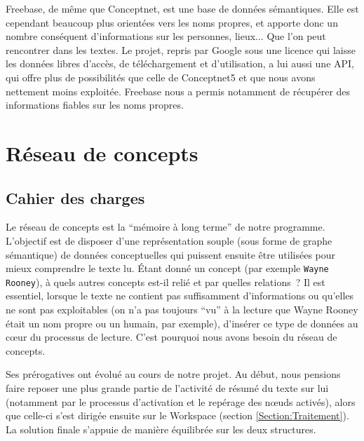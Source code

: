 \documentclass[a4paper, 12pt]{article}
\begin{document}
Freebase, de même que Conceptnet, est une base de données sémantiques. Elle est cependant beaucoup plus orientées vers les noms propres, et apporte donc un nombre conséquent d'informations sur les personnes, lieux... Que l'on peut rencontrer dans les textes. Le projet, repris par Google sous une licence qui laisse les données libres d'accès, de téléchargement et d'utilisation, a lui aussi une API, qui offre plus de possibilités que celle de Conceptnet5 et que nous avons nettement moins exploitée. Freebase nous a permis notamment de récupérer des informations fiables sur les noms propres.

\section{Réseau de concepts}\label{Section:RC}

\subsection{Cahier des charges}

Le réseau de concepts est la ``mémoire à long terme'' de notre programme. L'objectif est de disposer d'une représentation souple (sous forme de graphe sémantique) de données conceptuelles qui puissent ensuite être utilisées pour mieux comprendre le texte lu.
Étant donné un concept (par exemple \verb|Wayne Rooney|), à quels autres concepts est-il relié et par quelles relations~? Il est essentiel, lorsque le texte ne contient pas suffisamment d'informations ou qu'elles ne sont pas exploitables (on n'a pas toujours ``vu'' à la lecture que Wayne Rooney était un nom propre ou un humain, par exemple), d'insérer ce type de données au cœur du processus de lecture. C'est pourquoi nous avons besoin du réseau de concepts.

Ses prérogatives ont évolué au cours de notre projet. Au début, nous pensions faire reposer une plus grande partie de l'activité de résumé du texte sur lui (notamment par le processus d'activation et le repérage des nœuds activés), alors que celle-ci s'est dirigée ensuite sur le Workspace (section \ref{Section:Traitement}). La solution finale s'appuie de manière équilibrée sur les deux structures.
\end{document}

